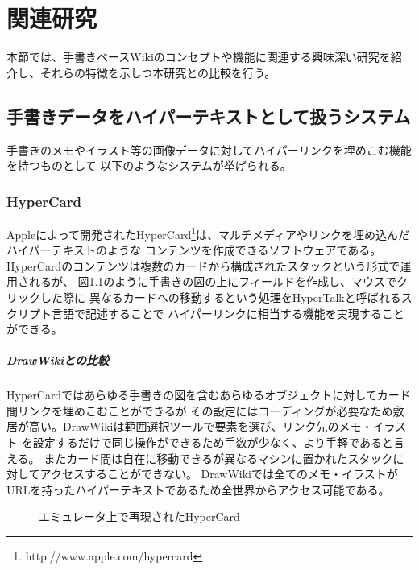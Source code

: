 \chapter{関連研究}
\label{chap:kanren}

本節では、手書きベースWikiのコンセプトや機能に関連する興味深い研究を紹介し、それらの特徴を示しつ本研究との比較を行う。
\newpage

\section{手書きデータをハイパーテキストとして扱うシステム}
手書きのメモやイラスト等の画像データに対してハイパーリンクを埋めこむ機能を持つものとして
以下のようなシステムが挙げられる。

\subsection{HyperCard}
Appleによって開発されたHyperCard\footnote{http://www.apple.com/hypercard}は、マルチメディアやリンクを埋め込んだハイパーテキストのような
コンテンツを作成できるソフトウェアである。
HyperCardのコンテンツは複数のカードから構成されたスタックという形式で運用されるが、
図\ref{fig:hypercard}のように手書きの図の上にフィールドを作成し、マウスでクリックした際に
異なるカードへの移動するという処理をHyperTalkと呼ばれるスクリプト言語で記述することで
ハイパーリンクに相当する機能を実現することができる。

\paragraph*{DrawWikiとの比較}
HyperCardではあらゆる手書きの図を含むあらゆるオブジェクトに対してカード間リンクを埋めこむことができるが
その設定にはコーディングが必要なため敷居が高い。DrawWikiは範囲選択ツールで要素を選び、リンク先のメモ・イラスト
を設定するだけで同じ操作ができるため手数が少なく、より手軽であると言える。
またカード間は自在に移動できるが異なるマシンに置かれたスタックに対してアクセスすることができない。
DrawWikiでは全てのメモ・イラストがURLを持ったハイパーテキストであるため全世界からアクセス可能である。

\begin{figure}[H]
    \centering
    \caption{エミュレータ上で再現されたHyperCard}
    \label{fig:hypercard}
\end{figure}

